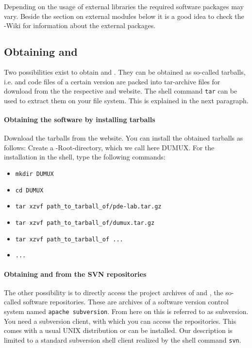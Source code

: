 Depending on the usage of external libraries the required software packages may vary. Beside the section on external modules below it is a good idea to check the \Dune-Wiki \cite{DUNE-HP} for information about the external packages.

\subsection{Obtaining \Dune and \Dumux}
Two possibilities exist to obtain \Dune and \Dumux. They can be obtained as so-called tarballs, i.e. \Dumux and \Dune code files of a certain version are packed into tar-archive files for download from the the respective {\Dune} and {\Dumux} website. The shell command \texttt{tar} can be used to extract them on your file system. This is explained in the next paragraph. 

\paragraph{Obtaining the software by installing tarballs}
Download the tarballs from the website. You can install the obtained tarballs as follows: Create a \Dune-Root-directory, which we call here DUMUX. For the installation in the shell, type the following commands: 
\begin{itemize}
\item \texttt{mkdir DUMUX}
\item \texttt{cd DUMUX}
\item \texttt{tar xzvf path\_to\_tarball\_of/pde-lab.tar.gz}
\item \texttt{tar xzvf path\_to\_tarball\_of/dumux.tar.gz}
\item \texttt{tar xzvf path\_to\_tarball\_of ...}
\item \texttt{...}
\end{itemize} 

\paragraph{Obtaining \Dune and \Dumux from the SVN repositories} 
The other possibility is to directly access the project archives of \Dune and \Dumux, the so-called software repositories. These are archives of a software version control system named \texttt{apache subversion}. From here on this is referred to as subversion.
You need a subversion client, with which you can access the repositories. This comes with a usual UNIX distribution or can be installed. Our description is limited to a standard subversion shell client realized by the shell command \texttt{svn}.

